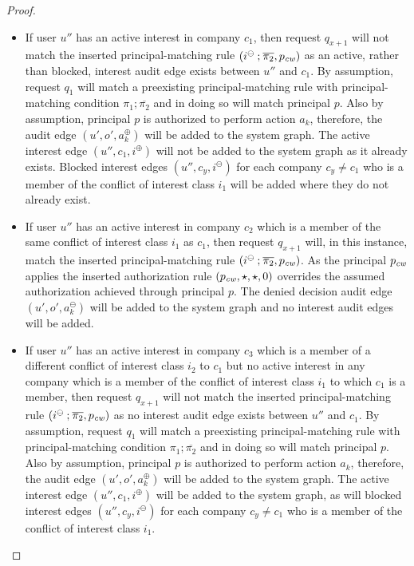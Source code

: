 \documentclass{article}
\newcommand{\comp}{\mathbin{;}}
\newcommand{\audita}[1]{\ensuremath{#1^\oplus}}
\newcommand{\auditd}[1]{\ensuremath{#1^\ominus}}
\newcommand{\interesta}{\ensuremath{i^\oplus}}
\newcommand{\interestb}{\ensuremath{i^\ominus}}
\begin{document}
\begin{proof}
\begin{itemize}
        \item If user $u''$ has an active interest in company $c_1$, then request $q_{x+1}$ will not match the inserted principal-matching rule $(\interestb \comp \overline{\pi_2}, p_{\it cw})$ as an active, rather than blocked, interest audit edge exists between $u''$ and $c_1$.
            By assumption, request $q_1$ will match a preexisting principal-matching rule with principal-matching condition $\pi_1 \comp \overline{\pi_2}$ and in doing so will match principal $p$.
            Also by assumption, principal $p$ is authorized to perform action $a_k$, therefore, the audit edge $(u',o',\audita{a_k})$ will be added to the system graph.
            The active interest edge $(u'',c_1,\interesta)$ will not be added to the system graph as it already exists.
            Blocked interest edges $(u'',c_y,\interestb)$ for each company $c_y \neq c_1$ who is a member of the conflict of interest class $i_1$ will be added where they do not already exist.

        \item If user $u''$ has an active interest in company $c_2$ which is a member of the same conflict of interest class $i_1$ as $c_1$, then request $q_{x+1}$ will, in this instance, match the inserted principal-matching rule $(\interestb \comp \overline{\pi_2}, p_{\it cw})$.
            As the principal $p_{\it cw}$ applies the inserted authorization rule $(p_{\it cw},\star,\star,0)$ overrides the assumed authorization achieved through principal $p$.
            The denied decision audit edge $(u',o',\auditd{a_k})$ will be added to the system graph and no interest audit edges will be added.

        \item If user $u''$ has an active interest in company $c_3$ which is a member of a different conflict of interest class $i_2$ to $c_1$ but no active interest in any company which is a member of the conflict of interest class $i_1$ to which $c_1$ is a member, then request $q_{x+1}$ will not match the inserted principal-matching rule $(\interestb \comp \overline{\pi_2}, p_{\it cw})$ as no interest audit edge exists between $u''$ and $c_1$.
            By assumption, request $q_1$ will match a preexisting principal-matching rule with principal-matching condition $\pi_1 \comp \overline{\pi_2}$ and in doing so will match principal $p$.
            Also by assumption, principal $p$ is authorized to perform action $a_k$, therefore, the audit edge $(u',o',\audita{a_k})$ will be added to the system graph.
            The active interest edge $(u'',c_1,\interesta)$ will be added to the system graph, as will blocked interest edges $(u'',c_y,\interestb)$ for each company $c_y \neq c_1$ who is a member of the conflict of interest class $i_1$.
\end{itemize}
\end{proof}
\end{document}
